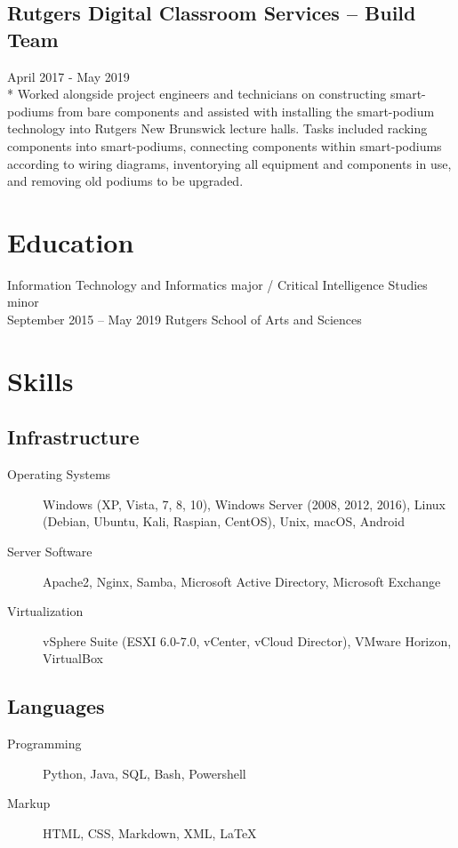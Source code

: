 \documentclass{article}
\begin{document}
\begin{samepage}
\subsection{Rutgers Digital Classroom Services -- Build Team}
April 2017 - May 2019\\*
Worked alongside project engineers and technicians on constructing smart-podiums from bare components and assisted with installing the smart-podium technology into Rutgers New Brunswick lecture halls. Tasks included racking components into smart-podiums, connecting components within smart-podiums according to wiring diagrams, inventorying all equipment and components in use, and removing old podiums to be upgraded.


\section{Education}
Information Technology and Informatics major /
Critical Intelligence Studies minor \\
September 2015 -- May 2019
Rutgers School of Arts and Sciences

\section{Skills}

\subsection{Infrastructure}
\begin{description}
\item[Operating Systems] Windows (XP, Vista, 7, 8, 10), Windows Server (2008, 2012, 2016), Linux (Debian, Ubuntu, Kali, Raspian, CentOS), Unix,  macOS, Android
\item[Server Software] Apache2, Nginx, Samba, Microsoft Active Directory, Microsoft Exchange
\item[Virtualization] vSphere Suite (ESXI 6.0-7.0, vCenter, vCloud Director), VMware Horizon, VirtualBox
\end{description}

\subsection{Languages}
\begin{description}
\item[Programming] Python, Java, SQL, Bash, Powershell
\item[Markup] HTML, CSS, Markdown, XML, {\LaTeX}
\end{description}


\end{samepage}
\end{document}
